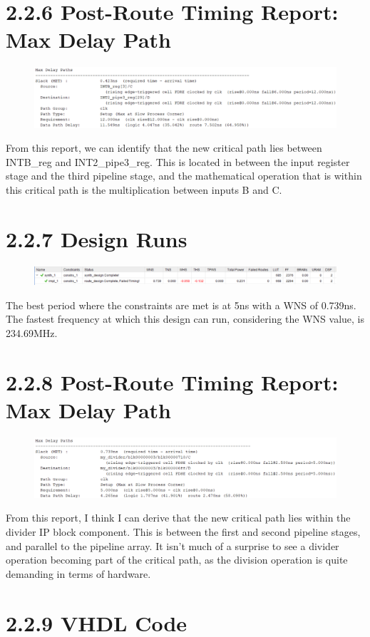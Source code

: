 \documentclass[11pt]{report}
\begin{document}
\section*{2.2.6 Post-Route Timing Report: Max Delay Path}
\begin{figure}[H]
    \includegraphics[width=\columnwidth]{Reports/Lab3/Assets/2.2.6_max-delay-path.png}
\end{figure}
From this report, we can identify that the new critical path lies between INTB\_reg and INT2\_pipe3\_reg. This is located in between the input register stage and the third pipeline stage, and the mathematical operation that is within this critical path is the multiplication between inputs B and C.

\section*{2.2.7 Design Runs}
\begin{figure}[H]
    \includegraphics[width=\columnwidth]{Reports/Lab3/Assets/2.2.7_design-runs.png}
\end{figure}
The best period where the constraints are met is at 5ns with a WNS of 0.739ns. The fastest frequency at which this design can run, considering the WNS value, is 234.69MHz.


\section*{2.2.8 Post-Route Timing Report: Max Delay Path}
\begin{figure}[H]
    \includegraphics[width=\columnwidth]{Reports/Lab3/Assets/2.2.8_max-delay-path.png}
\end{figure}
From this report, I think I can derive that the new critical path lies within the divider IP block component. This is between the first and second pipeline stages, and parallel to the pipeline array. It isn't much of a surprise to see a divider operation becoming part of the critical path, as the division operation is quite demanding in terms of hardware.

\section*{2.2.9 VHDL Code}
\inputminted{vhdl}{../../Lab3TaskBP3/Lab3TaskBP3.srcs/sources_1/imports/sources_1/imports/Digital Engineering/Algorithm.vhd}
\end{document}
